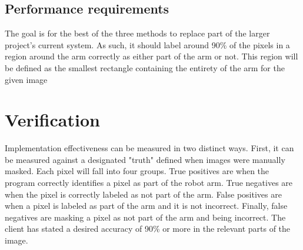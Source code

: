 \documentclass[10pt,journal,compsoc, draftclsnofoot,onecolumn]{IEEEtran}
\begin{document}
\subsection{Performance requirements}
The goal is for the best of the three methods to replace part of the larger project's current system.
As such, it should label around 90\% of the pixels in a region around the arm correctly as either part of the arm or not. This region will be defined as the smallest rectangle containing the entirety of the arm for the given image


\section {Verification}
Implementation effectiveness can be measured in two distinct ways.
First, it can be measured against a designated "truth" defined when images were manually masked.
Each pixel will fall into four groups.
True positives are when the program correctly identifies a pixel as part of the robot arm.
True negatives are when the pixel is correctly labeled as not part of the arm.
False positives are when a pixel is labeled as part of the arm and it is not incorrect.
Finally, false negatives are masking a pixel as not part of the arm and being incorrect.
The client has stated a desired accuracy of 90\% or more in the relevant parts of the image.%
\end{document}
